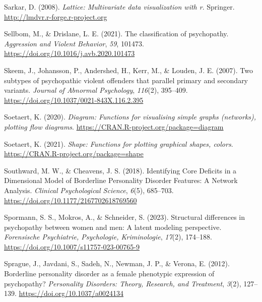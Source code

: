 \documentclass[
  man,floatsintext]{apa7}
\newlength{\cslhangindent}
\newlength{\cslentryspacingunit} %
\newenvironment{CSLReferences}[2] %
 {%
  \setlength{\parindent}{0pt}
  \ifodd #1
  \let\oldpar\par
  \def\par{\hangindent=\cslhangindent\oldpar}
  \fi
  \setlength{\parskip}{#2\cslentryspacingunit}
 }%
 {}
\begin{document}
\begin{CSLReferences}{1}{0}
\leavevmode{}%
Sarkar, D. (2008). \emph{Lattice: Multivariate data visualization with r}. Springer. \url{http://lmdvr.r-forge.r-project.org}

\leavevmode{}%
Sellbom, M., \& Drislane, L. E. (2021). The classification of psychopathy. \emph{Aggression and Violent Behavior}, \emph{59}, 101473. \url{https://doi.org/10.1016/j.avb.2020.101473}

\leavevmode{}%
Skeem, J., Johansson, P., Andershed, H., Kerr, M., \& Louden, J. E. (2007). Two subtypes of psychopathic violent offenders that parallel primary and secondary variants. \emph{Journal of Abnormal Psychology}, \emph{116}(2), 395--409. \url{https://doi.org/10.1037/0021-843X.116.2.395}

\leavevmode{}%
Soetaert, K. (2020). \emph{Diagram: Functions for visualising simple graphs (networks), plotting flow diagrams}. \url{https://CRAN.R-project.org/package=diagram}

\leavevmode{}%
Soetaert, K. (2021). \emph{Shape: Functions for plotting graphical shapes, colors}. \url{https://CRAN.R-project.org/package=shape}

\leavevmode{}%
Southward, M. W., \& Cheavens, J. S. (2018). Identifying {Core Deficits} in a {Dimensional Model} of {Borderline Personality Disorder Features}: {A Network Analysis}. \emph{Clinical Psychological Science}, \emph{6}(5), 685--703. \url{https://doi.org/10.1177/2167702618769560}

\leavevmode{}%
Spormann, S. S., Mokros, A., \& Schneider, S. (2023). Structural differences in psychopathy between women and men: A latent modeling perspective. \emph{Forensische Psychiatrie, Psychologie, Kriminologie}, \emph{17}(2), 174--188. \url{https://doi.org/10.1007/s11757-023-00765-9}

\leavevmode{}%
Sprague, J., Javdani, S., Sadeh, N., Newman, J. P., \& Verona, E. (2012). Borderline personality disorder as a female phenotypic expression of psychopathy? \emph{Personality Disorders: Theory, Research, and Treatment}, \emph{3}(2), 127--139. \url{https://doi.org/10.1037/a0024134}


\end{CSLReferences}
\end{document}
